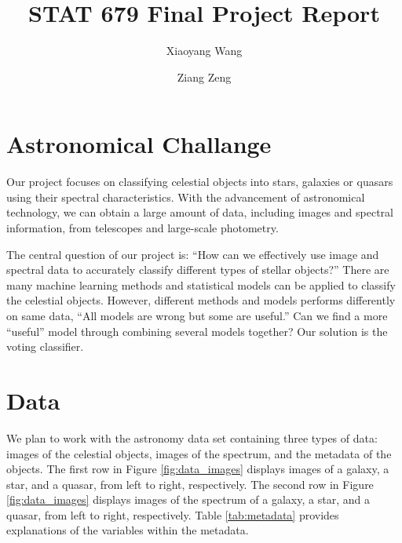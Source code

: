 \documentclass[
  11pt,
]{article}
\title{\textbf{STAT 679 Final Project Report}}
\author{Xiaoyang Wang \and Ziang Zeng}
\date{}
\begin{document}
\maketitle

\hypertarget{astronomical-challange}{%
\section{Astronomical Challange}\label{astronomical-challange}}

Our project focuses on classifying celestial objects into stars, galaxies or quasars using their spectral characteristics. With the advancement of astronomical technology, we can obtain a large amount of data, including images and spectral information, from telescopes and large-scale photometry.

The central question of our project is: ``How can we effectively use image and spectral data to accurately classify different types of stellar objects?'' There are many machine learning methods and statistical models can be applied to classify the celestial objects. However, different methods and models performs differently on same data, ``All models are wrong but some are useful.'' Can we find a more ``useful'' model through combining several models together? Our solution is the voting classifier.

\hypertarget{data}{%
\section{Data}\label{data}}

We plan to work with the astronomy data set containing three types of data: images of the celestial objects, images of the spectrum, and the metadata of the objects. The first row in Figure \ref{fig:data_images} displays images of a galaxy, a star, and a quasar, from left to right, respectively. The second row in Figure \ref{fig:data_images} displays images of the spectrum of a galaxy, a star, and a quasar, from left to right, respectively. Table \ref{tab:metadata} provides explanations of the variables within the metadata.
\end{document}
